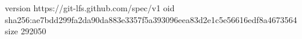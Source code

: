 version https://git-lfs.github.com/spec/v1
oid sha256:ae7bdd299fa2da90da883e3357f5a393096eea83d2e1c5e56616edf8a4673564
size 292050
